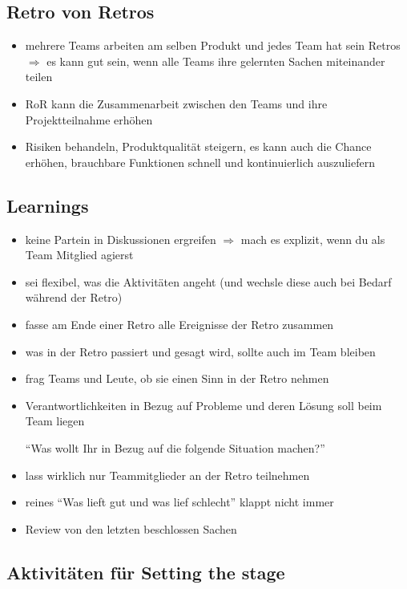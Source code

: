 \subsection{Retro von Retros}

\begin{itemize}
  \item mehrere Teams arbeiten am selben Produkt und jedes Team hat sein Retros $\Rightarrow$  es
  kann gut sein, wenn alle Teams ihre gelernten Sachen miteinander teilen
  \item RoR kann die Zusammenarbeit zwischen den Teams und ihre Projektteilnahme erhöhen
  \item Risiken behandeln, Produktqualität steigern, es kann auch die Chance erhöhen, brauchbare
    Funktionen schnell und kontinuierlich auszuliefern
\end{itemize}


\subsection{Learnings}
\begin{itemize}
  \item keine Partein in Diskussionen ergreifen $\Rightarrow$  mach es explizit, wenn du als
    Team Mitglied agierst
  \item sei flexibel, was die Aktivitäten angeht (und wechsle diese auch bei Bedarf während der
    Retro)
  \item fasse am Ende einer Retro alle Ereignisse der Retro zusammen
  \item was in der Retro passiert und gesagt wird, sollte auch im Team bleiben
  \item frag Teams und Leute, ob sie einen Sinn in der Retro nehmen
  \item Verantwortlichkeiten in Bezug auf Probleme und deren Lösung soll beim Team liegen

    \enquote{Was wollt Ihr in Bezug auf die folgende Situation machen?}
  \item lass wirklich nur Teammitglieder an der Retro teilnehmen
  \item reines \enquote{Was lieft gut und was lief schlecht} klappt nicht immer
  \item Review von den letzten beschlossen Sachen
\end{itemize}


\subsection{Aktivitäten für Setting the stage}
